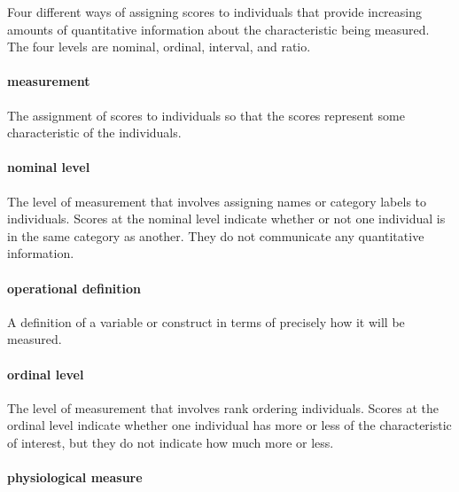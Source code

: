 \documentclass[
]{krantz}
\begin{document}
Four different ways of assigning scores to individuals that provide increasing amounts of quantitative information about the characteristic being measured. The four levels are nominal, ordinal, interval, and ratio.

\hypertarget{measurement}{%
\paragraph*{measurement}\label{measurement}}

The assignment of scores to individuals so that the scores represent some characteristic of the individuals.

\hypertarget{nominal-level}{%
\paragraph*{nominal level}\label{nominal-level}}

The level of measurement that involves assigning names or category labels to individuals. Scores at the nominal level indicate whether or not one individual is in the same category as another. They do not communicate any quantitative information.

\hypertarget{operational-definition-1}{%
\paragraph*{operational definition}\label{operational-definition-1}}

A definition of a variable or construct in terms of precisely how it will be measured.

\hypertarget{ordinal-level}{%
\paragraph*{ordinal level}\label{ordinal-level}}

The level of measurement that involves rank ordering individuals. Scores at the ordinal level indicate whether one individual has more or less of the characteristic of interest, but they do not indicate how much more or less.

\hypertarget{physiological-measure}{%
\paragraph*{physiological measure}\label{physiological-measure}}
\end{document}
